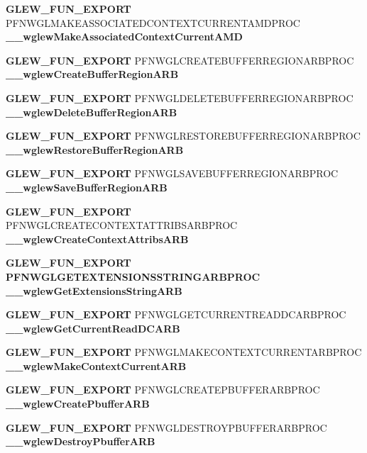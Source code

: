 \begin{DoxyCompactItemize}
{\bf G\+L\+E\+W\+\_\+\+F\+U\+N\+\_\+\+E\+X\+P\+O\+RT} P\+F\+N\+W\+G\+L\+M\+A\+K\+E\+A\+S\+S\+O\+C\+I\+A\+T\+E\+D\+C\+O\+N\+T\+E\+X\+T\+C\+U\+R\+R\+E\+N\+T\+A\+M\+D\+P\+R\+OC {\bf \+\_\+\+\_\+wglew\+Make\+Associated\+Context\+Current\+A\+MD}
\item 
{\bf G\+L\+E\+W\+\_\+\+F\+U\+N\+\_\+\+E\+X\+P\+O\+RT} P\+F\+N\+W\+G\+L\+C\+R\+E\+A\+T\+E\+B\+U\+F\+F\+E\+R\+R\+E\+G\+I\+O\+N\+A\+R\+B\+P\+R\+OC {\bf \+\_\+\+\_\+wglew\+Create\+Buffer\+Region\+A\+RB}
\item 
{\bf G\+L\+E\+W\+\_\+\+F\+U\+N\+\_\+\+E\+X\+P\+O\+RT} P\+F\+N\+W\+G\+L\+D\+E\+L\+E\+T\+E\+B\+U\+F\+F\+E\+R\+R\+E\+G\+I\+O\+N\+A\+R\+B\+P\+R\+OC {\bf \+\_\+\+\_\+wglew\+Delete\+Buffer\+Region\+A\+RB}
\item 
{\bf G\+L\+E\+W\+\_\+\+F\+U\+N\+\_\+\+E\+X\+P\+O\+RT} P\+F\+N\+W\+G\+L\+R\+E\+S\+T\+O\+R\+E\+B\+U\+F\+F\+E\+R\+R\+E\+G\+I\+O\+N\+A\+R\+B\+P\+R\+OC {\bf \+\_\+\+\_\+wglew\+Restore\+Buffer\+Region\+A\+RB}
\item 
{\bf G\+L\+E\+W\+\_\+\+F\+U\+N\+\_\+\+E\+X\+P\+O\+RT} P\+F\+N\+W\+G\+L\+S\+A\+V\+E\+B\+U\+F\+F\+E\+R\+R\+E\+G\+I\+O\+N\+A\+R\+B\+P\+R\+OC {\bf \+\_\+\+\_\+wglew\+Save\+Buffer\+Region\+A\+RB}
\item 
{\bf G\+L\+E\+W\+\_\+\+F\+U\+N\+\_\+\+E\+X\+P\+O\+RT} P\+F\+N\+W\+G\+L\+C\+R\+E\+A\+T\+E\+C\+O\+N\+T\+E\+X\+T\+A\+T\+T\+R\+I\+B\+S\+A\+R\+B\+P\+R\+OC {\bf \+\_\+\+\_\+wglew\+Create\+Context\+Attribs\+A\+RB}
\item 
{\bf G\+L\+E\+W\+\_\+\+F\+U\+N\+\_\+\+E\+X\+P\+O\+RT} {\bf P\+F\+N\+W\+G\+L\+G\+E\+T\+E\+X\+T\+E\+N\+S\+I\+O\+N\+S\+S\+T\+R\+I\+N\+G\+A\+R\+B\+P\+R\+OC} {\bf \+\_\+\+\_\+wglew\+Get\+Extensions\+String\+A\+RB}
\item 
{\bf G\+L\+E\+W\+\_\+\+F\+U\+N\+\_\+\+E\+X\+P\+O\+RT} P\+F\+N\+W\+G\+L\+G\+E\+T\+C\+U\+R\+R\+E\+N\+T\+R\+E\+A\+D\+D\+C\+A\+R\+B\+P\+R\+OC {\bf \+\_\+\+\_\+wglew\+Get\+Current\+Read\+D\+C\+A\+RB}
\item 
{\bf G\+L\+E\+W\+\_\+\+F\+U\+N\+\_\+\+E\+X\+P\+O\+RT} P\+F\+N\+W\+G\+L\+M\+A\+K\+E\+C\+O\+N\+T\+E\+X\+T\+C\+U\+R\+R\+E\+N\+T\+A\+R\+B\+P\+R\+OC {\bf \+\_\+\+\_\+wglew\+Make\+Context\+Current\+A\+RB}
\item 
{\bf G\+L\+E\+W\+\_\+\+F\+U\+N\+\_\+\+E\+X\+P\+O\+RT} P\+F\+N\+W\+G\+L\+C\+R\+E\+A\+T\+E\+P\+B\+U\+F\+F\+E\+R\+A\+R\+B\+P\+R\+OC {\bf \+\_\+\+\_\+wglew\+Create\+Pbuffer\+A\+RB}
\item 
{\bf G\+L\+E\+W\+\_\+\+F\+U\+N\+\_\+\+E\+X\+P\+O\+RT} P\+F\+N\+W\+G\+L\+D\+E\+S\+T\+R\+O\+Y\+P\+B\+U\+F\+F\+E\+R\+A\+R\+B\+P\+R\+OC {\bf \+\_\+\+\_\+wglew\+Destroy\+Pbuffer\+A\+RB}

\end{DoxyCompactItemize}
